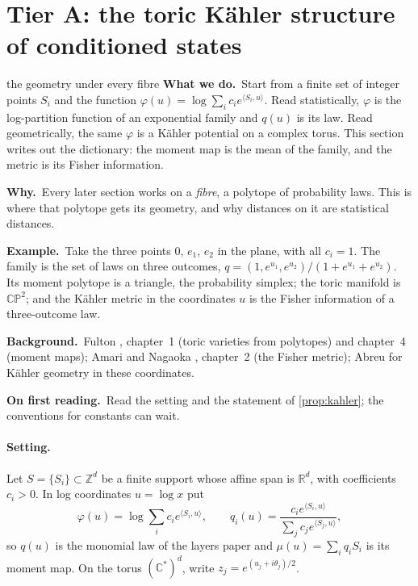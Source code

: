 \documentclass[11pt]{article}
\theoremstyle{definition}\newtheorem{definition}[theorem]{Definition}\newtheorem{remark}[theorem]{Remark}\newtheorem{example}[theorem]{Example}\newtheorem{problem}[theorem]{Open problem}\crefname{problem}{Problem}{Problems}
\newcommand{\R}{\mathbb R}
\newcommand{\rbwhat}{\textcolor{rbWhat}{\textbf{What we do.}}~}\newcommand{\rbwhy}{\par\smallskip\textcolor{rbWhy}{\textbf{Why.}}~}
\newcommand{\rbex}{\par\smallskip\textcolor{rbEx}{\textbf{Example.}}~}\newcommand{\rbbg}{\par\smallskip\textcolor{rbBg}{\textbf{Background.}}~}
\newcommand{\rbfirst}{\par\smallskip\textcolor{rbFirst}{\textbf{On first reading.}}~}
\begin{document}
\section{Tier A: the toric K\"ahler structure of conditioned states}\label{sec:tierA}
\begin{readerbox}{the geometry under every fibre}
\rbwhat Start from a finite set of integer points $S_i$ and the function $\varphi(u)=\log\sum_ic_ie^{\langle S_i,u\rangle}$. Read statistically, $\varphi$ is the log-partition function of an exponential family and $q(u)$ is its law. Read geometrically, the same $\varphi$ is a K\"ahler potential on a complex torus. This section writes out the dictionary: the moment map is the mean of the family, and the metric is its Fisher information.
\rbwhy Every later section works on a \emph{fibre}, a polytope of probability laws. This is where that polytope gets its geometry, and why distances on it are statistical distances.
\rbex Take the three points $0$, $e_1$, $e_2$ in the plane, with all $c_i=1$. The family is the set of laws on three outcomes, $q=(1,e^{u_1},e^{u_2})/(1+e^{u_1}+e^{u_2})$. Its moment polytope is a triangle, the probability simplex; the toric manifold is $\mathbb{CP}^2$; and the K\"ahler metric in the coordinates $u$ is the Fisher information of a three-outcome law.
\rbbg Fulton \cite{Fulton1993}, chapter~1 (toric varieties from polytopes) and chapter~4 (moment maps); Amari and Nagaoka \cite{AmariNagaoka2000}, chapter~2 (the Fisher metric); Abreu \cite{Abreu2003} for K\"ahler geometry in these coordinates.
\rbfirst Read the setting and the statement of \cref{prop:kahler}; the conventions for constants can wait.
\end{readerbox}
\paragraph{Setting.} Let $S=\{S_i\}\subset\mathbb Z^d$ be a finite support whose affine span is $\R^d$, with coefficients $c_i>0$. In log coordinates $u=\log x$ put
\[
\varphi(u)=\log\sum_ic_ie^{\langle S_i,u\rangle},\qquad q_i(u)=\frac{c_ie^{\langle S_i,u\rangle}}{\sum_jc_je^{\langle S_j,u\rangle}} ,
\]
so $q(u)$ is the monomial law of the layers paper and $\mu(u)=\sum_iq_iS_i$ is its moment map. On the torus $(\mathbb C^*)^d$, write $z_j=e^{(u_j+i\theta_j)/2}$.
\end{document}
